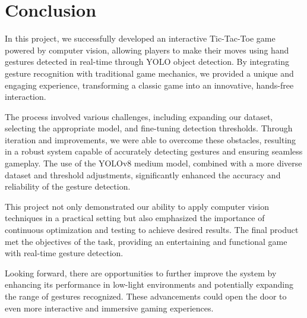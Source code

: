 \documentclass[a4paper,12pt]{article}
\begin{document}
\section{Conclusion}
In this project, we successfully developed an interactive Tic-Tac-Toe game powered by computer vision, allowing players to make their moves using hand gestures detected in real-time through YOLO object detection. By integrating gesture recognition with traditional game mechanics, we provided a unique and engaging experience, transforming a classic game into an innovative, hands-free interaction.

The process involved various challenges, including expanding our dataset, selecting the appropriate model, and fine-tuning detection thresholds. Through iteration and improvements, we were able to overcome these obstacles, resulting in a robust system capable of accurately detecting gestures and ensuring seamless gameplay. The use of the YOLOv8 medium model, combined with a more diverse dataset and threshold adjustments, significantly enhanced the accuracy and reliability of the gesture detection.

This project not only demonstrated our ability to apply computer vision techniques in a practical setting but also emphasized the importance of continuous optimization and testing to achieve desired results. The final product met the objectives of the task, providing an entertaining and functional game with real-time gesture detection.

Looking forward, there are opportunities to further improve the system by enhancing its performance in low-light environments and potentially expanding the range of gestures recognized. These advancements could open the door to even more interactive and immersive gaming experiences.
\end{document}
